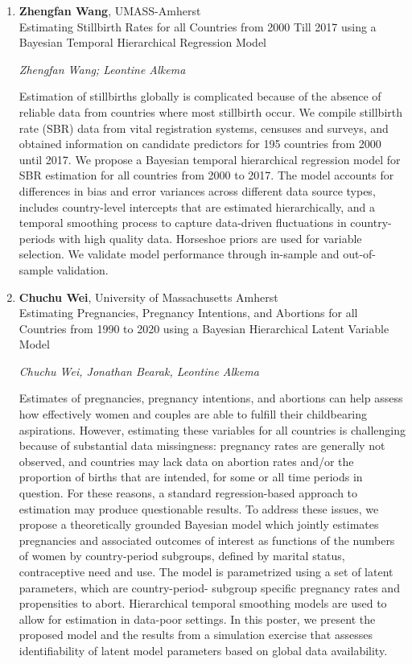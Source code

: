 \begin{enumerate}
\item \textbf{Zhengfan Wang}, UMASS-Amherst \\
Estimating Stillbirth Rates for all Countries from 2000 Till 2017 using a Bayesian Temporal Hierarchical Regression Model

\emph{\footnotesize Zhengfan Wang; Leontine Alkema}

Estimation of stillbirths globally is complicated because of the absence of reliable data from countries where most stillbirth occur. We compile stillbirth rate (SBR) data from vital registration systems, censuses and surveys, and obtained information on candidate predictors for 195 countries from 2000 until 2017. We propose a Bayesian temporal hierarchical regression model for SBR estimation for all countries from 2000 to 2017. The model accounts for differences in bias and error variances across different data source types, includes country-level intercepts that are estimated hierarchically, and a temporal smoothing process to capture data-driven fluctuations in country-periods with high quality data. Horseshoe priors are used for variable selection. We validate model performance through in-sample and out-of-sample validation. 


\item \textbf{Chuchu Wei}, University of Massachusetts Amherst \\
Estimating Pregnancies, Pregnancy Intentions, and Abortions for all Countries from 1990 to 2020 using a Bayesian Hierarchical Latent Variable Model

\emph{\footnotesize Chuchu Wei, Jonathan Bearak, Leontine Alkema}

Estimates of pregnancies, pregnancy intentions, and abortions can help assess how effectively women and couples are able to fulfill their childbearing aspirations. However, estimating these variables for all countries is challenging because of substantial data missingness: pregnancy rates are generally not observed, and countries may lack data on abortion rates and/or the proportion of births that are intended, for some or all time periods in question. For these reasons, a standard regression-based approach to estimation may produce questionable results. To address these issues, we propose a theoretically grounded Bayesian model which jointly estimates pregnancies and associated outcomes of interest as functions of the numbers of women by country-period subgroups, defined by marital status, contraceptive need and use. The model is parametrized using a set of latent parameters, which are country-period- subgroup specific pregnancy rates and propensities to abort. Hierarchical temporal smoothing models are used to allow for estimation in data-poor settings. In this poster, we present the proposed model and the results from a simulation exercise that assesses identifiability of latent model parameters based on global data availability.


\end{enumerate}
